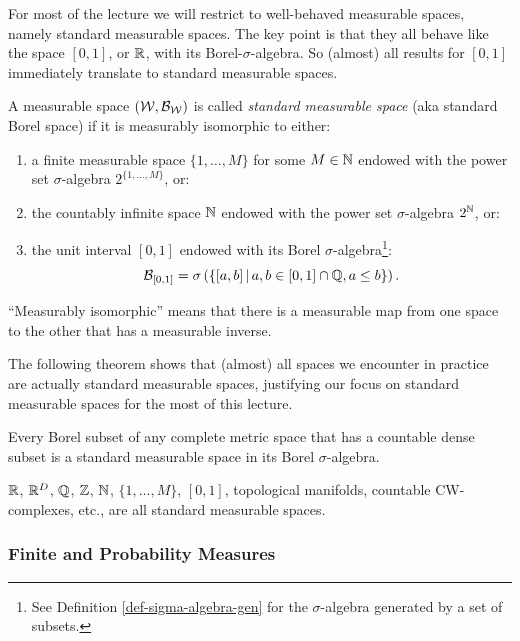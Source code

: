 For most of the lecture we will restrict to well-behaved measurable spaces, namely standard measurable spaces. 
The key point is that they all behave like the space $[0,1]$, or $\mathbb{R}$, with its Borel-$\sigma$-algebra. So (almost) all results for $[0,1]$ immediately translate to standard measurable spaces. 

\begin{Def}
 A measurable space $(\mathcal{W},\mathcal{B}_{\mathcal{W}})$ is called \emph{standard measurable space} (aka standard Borel space) if it is measurably isomorphic to either:
    \begin{enumerate}
        \item a finite measurable space $\{1,\dots,M\}$ for some $M \in \mathbb{N}$ endowed with the power set $\sigma$-algebra $2^{\{1,\dots,M\}}$, or:
        \item the countably infinite space $\mathbb{N}$ endowed with the power set $\sigma$-algebra $2^{\mathbb{N}}$, or:
        \item the unit interval $[0,1]$ endowed with its Borel $\sigma$-algebra\footnote{See Definition \ref{def-sigma-algebra-gen} for the $\sigma$-algebra generated by a set of subsets.}:
           \[\mathcal{B}_{[0,1]} =\sigma\left (\left \{ [a,b] \,\middle|\, a, b \in [0,1] \cap \mathbb{Q}, a \le b \right \} \right ).\]
    \end{enumerate}
    ``Measurably isomorphic'' means that there is a measurable map from one space to the other that has a measurable inverse.
\end{Def}

The following theorem shows that (almost) all spaces we encounter in practice are actually standard measurable spaces, justifying our focus on standard measurable spaces for the most of this lecture.

\begin{Thm}
        Every Borel subset of any complete metric space that has a countable dense subset is a standard measurable space in its Borel $\sigma$-algebra.
\end{Thm}

\begin{Eg}
    $\mathbb{R}$, $\mathbb{R}^D$, $\mathbb{Q}$, $\mathbb{Z}$, $\mathbb{N}$, $\{1,\dots,M\}$,  $[0,1]$, topological manifolds, countable CW-complexes, etc., are all standard measurable spaces. 
\end{Eg}


\subsubsection{Finite and Probability Measures}

